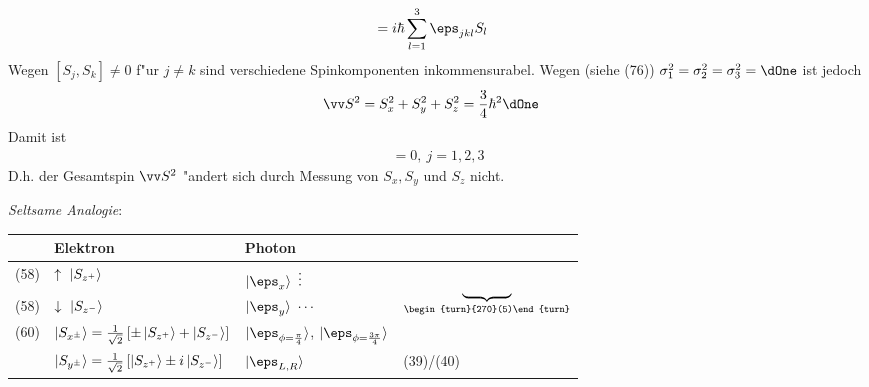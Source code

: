 \documentclass[a4paper]{scrartcl}
\begin{document}
{\begin{align}
[S_j, S_k] & = i\hbar \sum_{l=1}^3 \eps_{jkl} S_l
\end{align}
Wegen $[S_j, S_k] \neq 0$ f"ur $j \neq k$ sind verschiedene Spinkomponenten inkommensurabel. Wegen (siehe (76)) $\sigma_1^2 = \sigma^2_2 = \sigma_3^2 = \dOne$ ist jedoch
\begin{align}
\vv S^2 & = S_x^2 + S_y^2 + S_z^2 = \frac34 \hbar^2 \dOne
\end{align}
Damit ist 
\begin{align}
[\vv S^2, S_j ] = 0, \ j = 1,2,3
\end{align}
D.h. der Gesamtspin $\vv S^2$ "andert sich durch Messung von $S_x, S_y$ und $S_z$ nicht.

\emph{Seltsame Analogie}:

\begin{tabular}{r l | l l}
& Elektron & Photon \\
\hline
(58) & $\uparrow \ \ket {S_{z^+}}$ & $\ket{ \eps_x} \ \vdots$ & \multirow{3}{*}{ \begin{turn}{90}
$\underbrace{\hspace{3.5em}}_{\begin{turn}{270}(5)\end{turn}}$
\end{turn}} \\
(58) & $\downarrow \ \ket{ S_{z^-}}$ & $\ket{ \eps_y} \ \cdots$ \\
(60) &  $\ket{ S_{x^\pm}} = \frac1{\sqrt2} \left[ \pm \ket{S_{z^+}} + \ket{S_{z^-}} \right]$ & $\ket{\eps_{\phi = \frac\pi4}}$, $\ket{\eps_{\phi = \frac{3\pi}4}}$ \\
 & $\ket{S_{y^\pm}} = \frac1{\sqrt2} \left[ \ket{S_{z^+}} \pm i \ket{S_{z^-}} \right]$ & $\ket{\eps_{L,R}}$ & (39)/(40)
\end{tabular}

}
\end{document}
